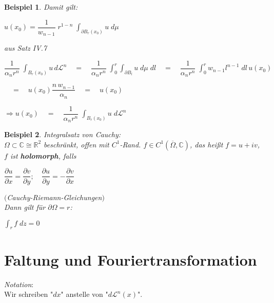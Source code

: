 \documentclass[11pt]{memoir}
\theoremstyle{changebreak}
\newtheorem{Beispiel}{Beispiel}[chapter]
\newcommand{\dom}{\partial\Omega}
\newcommand{\oo}{\overline{\Omega}}
\begin{document}
\begin{Beispiel}
\par\bigskip
Damit gilt:
\begin{center}
	$u(x_0) = \dfrac{1}{w_{n-1}}\; r^{1-n} \; \int_{\partial B_r(x_0)} u \; d\mu$
\end{center}

aus Satz IV.7
\par\bigskip
$\dfrac{1}{\alpha_n r^n} \; \int_{B_r(x_0)} u \, d\mathscr L^n 
\quad = \quad 
\dfrac{1}{\alpha_n r^n} \; \int_0^r \int_{\partial B_l} u \; d\mu \;dl
\quad = \quad 
\dfrac{1}{\alpha_n r^n} \; \int_0^r w_{n-1} l^{n-1} \; dl \, u(x_0)$
\par\bigskip
$\quad = \quad u(x_0) \dfrac{n \,w_{n-1}}{\alpha_n} 
\quad = \quad
u(x_0)$
\begin{center}
	$\Rightarrow u(x_0) \quad = \quad \dfrac{1}{\alpha_n r^n} \; \int_{B_r(x_0)} u \;d\mathscr L^n$
\end{center}

\end{Beispiel}

\begin{Beispiel}
\emph{Integralsatz von Cauchy}: \\
$\Omega \subset \mathbb C \cong \mathbb R^2$ beschränkt, offen mit $C^1$-Rand.
$f \in C^1(\oo, \mathbb C)$, das heißt $f = u + i v$, $f$ ist \textbf{holomorph}, falls
\begin{center}
	$\dfrac{\partial u}{\partial x} = \dfrac{\partial v}{\partial y}; \quad \dfrac{\partial u}{\partial y} = - \dfrac{\partial v}{\partial x}$
\end{center}
$($Cauchy-Riemann-Gleichungen$)$ \\
Dann gilt für $\dom = r$:
\begin{center}
	$\int_r f\; dz = 0$
\end{center}
\end{Beispiel}





\chapter{Faltung und Fouriertransformation}

\emph{Notation}: \\
Wir schreiben "$dx$"\; anstelle von "$d\mathscr L^n(x)$".
\end{document}
